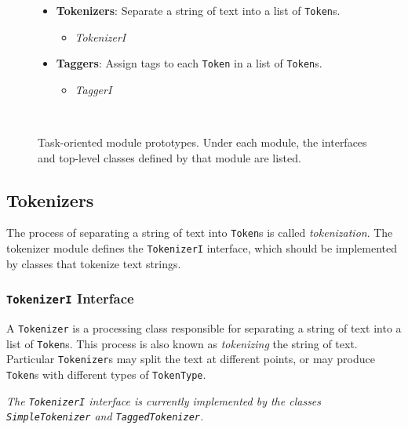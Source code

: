 \documentclass{article}
\begin{document}
\begin{figure}
\noindent
\begin{centering}
\begin{boxedminipage}{.95\textwidth}
\begin{itemize}
  \item \textbf{Tokenizers}: Separate a string of text into a list of
       \texttt{Token}s. 
  \begin{itemize}
     \item \textit{TokenizerI}
  \end{itemize}

  \item \textbf{Taggers}: Assign tags to each \texttt{Token} in a list of \texttt{Token}s.
  \begin{itemize}
     \item \textit{TaggerI}
  \end{itemize}
\end{itemize}
\end{boxedminipage}\\
\end{centering}
 \caption[Task-oriented module prototypes]{Task-oriented module
 prototypes.  Under each module, the interfaces and top-level classes
 defined by that module are listed.}
\label{fig:mod-task}
\end{figure}

\subsection{Tokenizers}

The process of separating a string of text into \texttt{Token}s is called
\emph{tokenization}.  The tokenizer module defines the
\texttt{TokenizerI} interface, which should be implemented by classes
that tokenize text strings.

\subsubsection{\texttt{TokenizerI} Interface}

    A \texttt{Tokenizer} is a processing class responsible for
    separating a string of text into a list of \texttt{Token}s.  This
    process is also known as \emph{tokenizing} the string of text.
    Particular \texttt{Tokenizer}s may split the text at different
    points, or may produce \texttt{Token}s with different types of
    \texttt{TokenType}.

\vspace{2mm}\noindent
\textit{The \texttt{TokenizerI} interface is currently implemented by
the classes \texttt{SimpleTokenizer} and \texttt{TaggedTokenizer}.}
\end{document}

